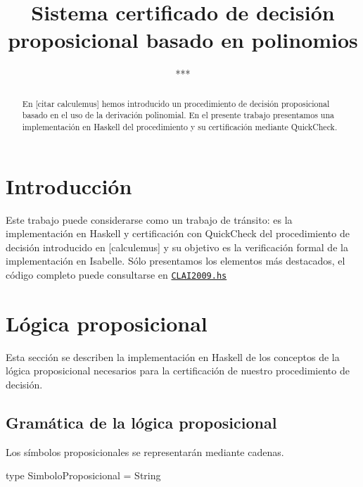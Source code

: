 \documentclass{llncs}
\begin{document}
\title{Sistema certificado de decisión proposicional basado en polinomios} 

\author{*** }


\maketitle

\begin{abstract}
En [citar calculemus] hemos introducido un procedimiento de decisión
proposicional basado en el uso de la derivación polinomial. En el presente
trabajo presentamos una implementación en Haskell del procedimiento y su
certificación mediante QuickCheck. 
\end{abstract}

\section{Introducción}
Este trabajo puede considerarse como un trabajo de tránsito: es la
implementación en Haskell y certificación con QuickCheck del procedimiento de
decisión introducido en [calculemus] y su objetivo es la verificación formal
de la implementación en Isabelle. Sólo presentamos los elementos más
destacados, el código completo puede consultarse en 
\href{http://www.cs.us.es/~jalonso/CLAI2009.hs}{\texttt{CLAI2009.hs}}

\section{Lógica proposicional}
Esta sección se describen la implementación en Haskell de los conceptos de la
lógica proposicional necesarios para la certificación de nuestro procedimiento
de decisión.

\subsection{Gramática de la lógica proposicional}
Los símbolos proposicionales se representarán mediante cadenas.
\begin{code}
type SimboloProposicional = String
\end{code}
\end{document}

